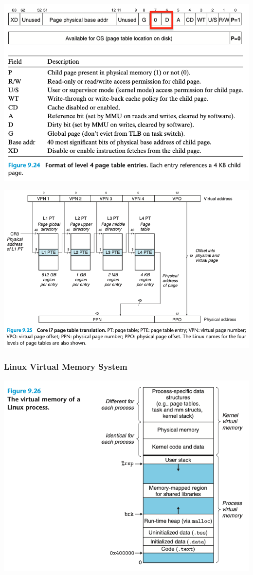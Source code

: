 \documentclass[11pt]{article}
\begin{document}
\begin{center}
\includegraphics[width=.9\linewidth]{pics/figure9.24-i7-l4-table-entry.png}
\end{center}

\begin{center}
\includegraphics[width=.9\linewidth]{pics/figure9.25-i7-page-table-translation.png}
\end{center}

\subsubsection{Linux Virtual Memory System}
\label{sec:org75a94fb}

\begin{center}
\includegraphics[width=.9\linewidth]{pics/figure9.26-virtual-memory-of-a-linux-process.png}
\end{center}
\end{document}
